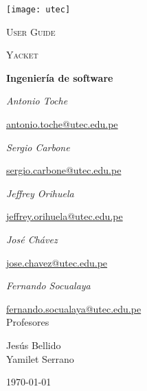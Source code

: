 \documentclass{article}
\begin{document}
\begin{titlepage}
	\centering
	\texttt{[image: utec]}\par\vspace{1cm}
	{\scshape\LARGE User Guide \par}
	\vspace{0.5cm}
	{\scshape\Large Yacket\par}
	\vspace{0.5cm}
	{\huge\bfseries Ingeniería de software\par}
	\vspace{1.0cm}
	{\Large\itshape Antonio Toche\par}
	\href{mailto:antonio.toche@utec.edu.pe}{antonio.toche@utec.edu.pe}\\
	\vspace{1.0cm}
	{\Large\itshape Sergio Carbone\par}
	\href{mailto:sergio.carbone@utec.edu.pe}{sergio.carbone@utec.edu.pe}\\
	\vspace{1.0cm}
	{\Large\itshape Jeffrey Orihuela\par}
	\href{mailto:sergio.carbone@utec.edu.pe}{jeffrey.orihuela@utec.edu.pe}\\
	\vspace{1.0cm}
	{\Large\itshape José Chávez\par}
	\href{mailto:jose.chavez@utec.edu.pe}{jose.chavez@utec.edu.pe}\\
	\vspace{1.0cm}
	{\Large\itshape Fernando Socualaya\par}
	\href{mailto:fernando.socualaya@utec.edu.pe}{fernando.socualaya@utec.edu.pe}\\
	\vspace{1.0cm}
	\vfill
	Profesores\par
	Jesús Bellido\\
	Yamilet Serrano\\
	\vfill
	{\large \today\par}
\end{titlepage}
\end{document}
